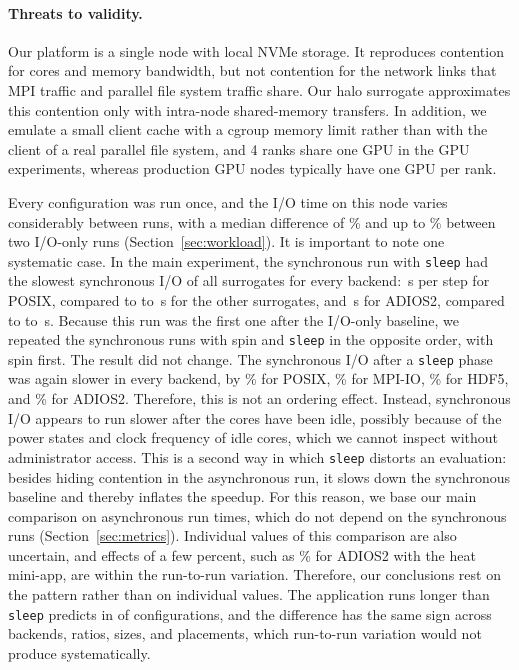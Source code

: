 \paragraph{Threats to validity.}
\label{sec:threats}
Our platform is a single node with local NVMe storage. It reproduces
contention for cores and memory bandwidth, but not contention for the
network links that MPI traffic and parallel file system traffic share. Our
halo surrogate approximates this contention only with intra-node
shared-memory transfers. In addition, we emulate a small client cache with a
cgroup memory limit rather than with the client of a real parallel file
system, and 4 ranks share one GPU in the GPU experiments, whereas production
GPU nodes typically have one GPU per rank.

Every configuration was run once, and the I/O time on this node varies
considerably between runs, with a median difference of \VarMedian\% and up
to \VarMax\% between two I/O-only runs (Section~\ref{sec:workload}). It is
important to note one systematic case. In the main experiment, the
synchronous run with \texttt{sleep} had the slowest synchronous I/O of all
surrogates for every backend: \SynciosleepPosix\,s per step for POSIX,
compared to \SynciootherminPosix to \SyncioothermaxPosix\,s for the other
surrogates, and \SynciosleepAdios\,s for ADIOS2, compared to
\SynciootherminAdios to \SyncioothermaxAdios\,s. Because this run was the
first one after the I/O-only baseline, we repeated the synchronous runs with
spin and \texttt{sleep} in the opposite order, with spin first. The result
did not change. The synchronous I/O after a \texttt{sleep} phase was again
slower in every backend, by \RecheckpctPosix\% for POSIX, \RecheckpctMpiio\%
for MPI-IO, \RecheckpctHdf\% for HDF5, and \RecheckpctAdios\% for ADIOS2.
Therefore, this is not an ordering effect. Instead, synchronous I/O appears
to run slower after the cores have been idle, possibly because of the power
states and clock frequency of idle cores, which we cannot inspect without
administrator access. This is a second way in which \texttt{sleep} distorts
an evaluation: besides hiding contention in the asynchronous run, it slows
down the synchronous baseline and thereby inflates the speedup. For this
reason, we
base our main comparison on asynchronous run times, which do not depend on
the synchronous runs (Section~\ref{sec:metrics}). Individual values of this
comparison are also uncertain, and effects of a few percent, such as
\ExcpctAdiosHeat\% for ADIOS2 with the heat mini-app, are within the
run-to-run variation. Therefore, our conclusions rest on the pattern rather
than on individual values. The application runs longer than \texttt{sleep}
predicts in \ExcLongerFive of \ExcN configurations, and the difference has the
same sign across backends, ratios, sizes, and placements, which run-to-run
variation would not produce systematically.

